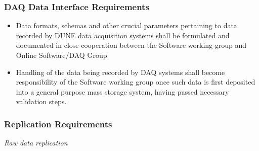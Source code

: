 \subsubsection{DAQ Data Interface Requirements}
\begin{itemize}
\item Data formats, schemas and other crucial parameters pertaining to data recorded by DUNE  data acquisition systems shall 
be formulated and documented in close cooperation between the Software working group and Online Software/DAQ Group.

\item Handling of the data being recorded by DAQ systems shall become responsibility of the Software working group once such 
data is first deposited into a general purpose mass storage system, having passed necessary validation steps.

\end{itemize}

\subsubsection{Replication Requirements}
\label{sec:req-raw-data-replication}
\textit{Raw data replication}

